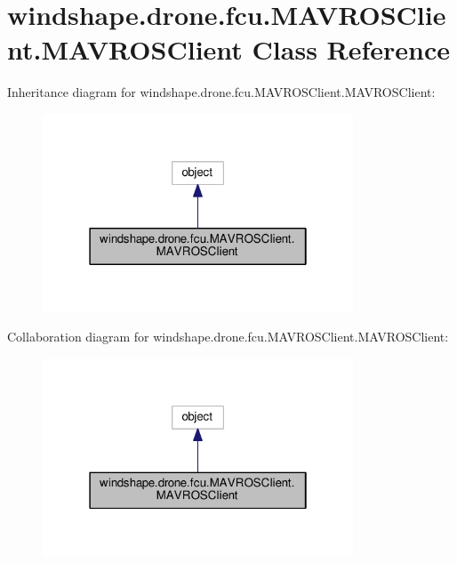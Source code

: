 \hypertarget{classwindshape_1_1drone_1_1fcu_1_1_m_a_v_r_o_s_client_1_1_m_a_v_r_o_s_client}{}\section{windshape.\+drone.\+fcu.\+M\+A\+V\+R\+O\+S\+Client.\+M\+A\+V\+R\+O\+S\+Client Class Reference}
\label{classwindshape_1_1drone_1_1fcu_1_1_m_a_v_r_o_s_client_1_1_m_a_v_r_o_s_client}


Inheritance diagram for windshape.\+drone.\+fcu.\+M\+A\+V\+R\+O\+S\+Client.\+M\+A\+V\+R\+O\+S\+Client\+:\nopagebreak
\begin{figure}[H]
\begin{center}
\leavevmode
\includegraphics[width=262pt]{classwindshape_1_1drone_1_1fcu_1_1_m_a_v_r_o_s_client_1_1_m_a_v_r_o_s_client__inherit__graph}
\end{center}
\end{figure}


Collaboration diagram for windshape.\+drone.\+fcu.\+M\+A\+V\+R\+O\+S\+Client.\+M\+A\+V\+R\+O\+S\+Client\+:\nopagebreak
\begin{figure}[H]
\begin{center}
\leavevmode
\includegraphics[width=262pt]{classwindshape_1_1drone_1_1fcu_1_1_m_a_v_r_o_s_client_1_1_m_a_v_r_o_s_client__coll__graph}
\end{center}
\end{figure}

